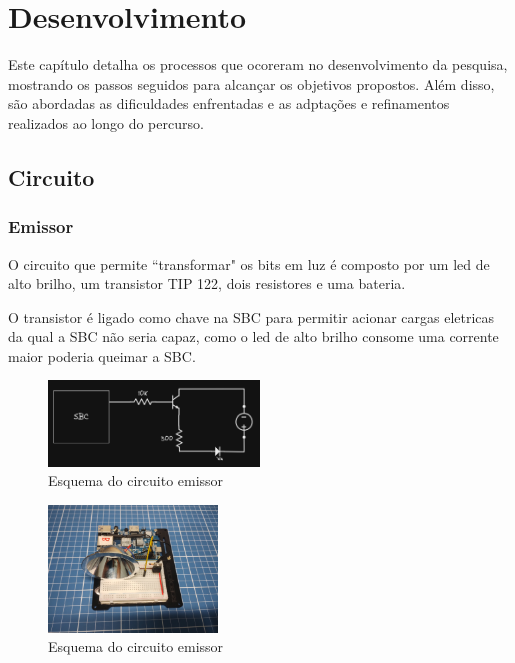 \section{Desenvolvimento}

Este capítulo detalha os processos que ocoreram no desenvolvimento da pesquisa, mostrando os passos seguidos para alcançar os objetivos propostos. Além disso, são abordadas as dificuldades enfrentadas e as adptações e refinamentos realizados ao longo do percurso.

\subsection{Circuito}

\subsubsection{Emissor}

O circuito que permite ``transformar" os bits em luz é composto por um led de alto brilho, um transistor TIP 122, dois resistores e uma bateria.

O transistor é ligado como chave na SBC para permitir acionar cargas eletricas da qual a SBC não seria capaz, como o led de alto brilho consome uma corrente maior poderia queimar a SBC.

\begin{figure}[!htbp]
  \includegraphics[width=0.5\textwidth]{images/esquema_circuito_emisor.png}
  \caption{Esquema do circuito emissor}
  \label{esquema-circuito-emissor}
\end{figure}

\begin{figure}[!htbp]
  \includegraphics[width=0.4\textwidth]{images/foto_circuito_emisor.jpg}
  \caption{Esquema do circuito emissor}
  \label{foto-circuito-emissor}
\end{figure}


